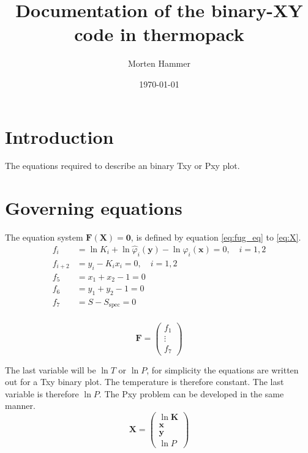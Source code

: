 \documentclass[english]{../thermomemo/thermomemo}
\title{Documentation of the binary-XY code in thermopack}
\author{Morten Hammer}
\date{\today}
\newcommand{\spec}{\text{spec}}
\begin{document}
\frontmatter

\tableofcontents

\clearpage

\section{Introduction}
The equations required to describe an binary Txy or Pxy plot.

\section{Governing equations}
\label{sec:eqn}
The equation system $\mathbf{F(X)}=\mathbf{0}$, is defined by equation
\eqref{eq:fug_eq} to \eqref{eq:X}.
\begin{align}
 f_i  & = \ln K_i + \ln \hat{\varphi}_i\left(\mathbf{y}\right)- \ln
 \hat{\varphi}_i\left(\mathbf{x}\right) = 0, \quad
 i=1,2 \label{eq:fug_eq} \\
 f_{i+2}  & = y_i - K_i x_i = 0, \quad i=1,2 \label{eq:k_eq} \\
 f_{5}  & = x_1 + x_2 - 1 = 0 \label{eq:x_eq} \\
 f_{6}  & = y_1 + y_2 - 1 = 0 \label{eq:y_eq} \\
 f_{7}  & = S - S_{\spec} = 0 \label{eq:spec_eq} \\
\end{align}

\begin{equation}
\label{eq:F}
 \mathbf{F} = \begin{pmatrix}
          f_1 \\
          \vdots \\
          f_7
\end{pmatrix}
\end{equation}

The last variable will be $\ln T$ or $\ln P$, for simplicity the
equations are written out for a Txy binary plot. The temperature is
therefore constant. The last variable is therefore $\ln P$. The Pxy
problem can be developed in the same manner.   
\begin{equation}
\label{eq:X}
 \mathbf{X} = \begin{pmatrix}
          \ln \mathbf{K} \\
          \mathbf{x} \\
          \mathbf{y} \\
          \ln P
\end{pmatrix}
\end{equation}
\end{document}
